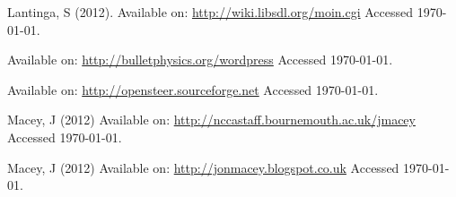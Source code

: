 \documentclass[]{article}
\begin{document}
\newpage




\begin{thebibliography}{}

Lantinga, S (2012).
\newblock Available on:
  \url{http://wiki.libsdl.org/moin.cgi}
\newblock Accessed \today.

\newblock Available on:
  \url{http://bulletphysics.org/wordpress}
\newblock Accessed \today.

\newblock Available on:
  \url{http://opensteer.sourceforge.net}
\newblock Accessed \today.

Macey, J (2012)
\newblock Available on:
  \url{http://nccastaff.bournemouth.ac.uk/jmacey}
\newblock Accessed \today.

Macey, J (2012)
\newblock Available on:
  \url{http://jonmacey.blogspot.co.uk}
\newblock Accessed \today.

\end{thebibliography}
\end{document}
